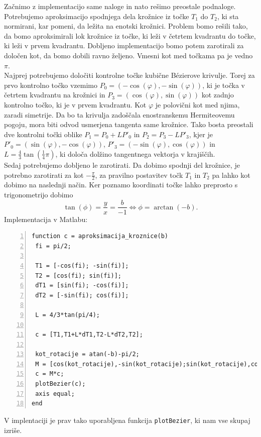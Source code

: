 \documentclass[a4paper,12pt]{article}
\begin{document}
	Začnimo z implementacijo same naloge in nato rešimo preostale podnaloge.
	Potrebujemo aproksimacijo spodnjega dela krožnice iz točke $T_1$ do $T_2$, ki sta normirani, kar pomeni, da ležita na enotski krožnici.
	Problem bomo rešili tako, da bomo aproksimirali lok krožnice iz točke, ki leži v četrtem kvadrantu do točke, ki leži v prvem kvadrantu. 
	Dobljeno implementacijo bomo potem zarotirali za določen kot, da bomo dobili ravno željeno. Vmesni kot med točkama pa je vedno $\pi$.
	\\
	Najprej potrebujemo določiti kontrolne točke kubične B\'{e}zierove krivulje. Torej za prvo kontrolno točko vzemimo $P_0 = (-\cos(\varphi), -\sin(\varphi))$, 
	ki je točka v četrtem kvadrantu na krožnici in 
	$P_3 = (\cos(\varphi), \sin(\varphi))$ kot zadnjo kontrolno točko, ki je v prvem kvadrantu. Kot $\varphi$ je polovični kot med njima, zaradi simetrije.
	Da bo ta krivulja zadoščala enostranskemu Hermiteovemu pogoju, mora biti odvod usmerjena tangenta same krožnice.
	Tako bosta preostali dve kontrolni točki oblike $P_1 = P_0 + LP'_0$ in $P_2 = P_3 - LP'_3$, kjer je $P'_0 = (\sin(\varphi), -\cos(\varphi))$, $P'_3 = (-\sin(\varphi), \cos(\varphi))$ in
	$L = \frac{4}{3} \tan(\frac{1}{4}\pi)$, ki določa dolžino tangentnega vektorja v krajiščih.
	\\
	Sedaj potrebujemo dobljeno le zarotirati. Da dobimo spodnji del krožnice, je potrebno zarotirati za kot $-\frac{\pi}{2}$, za pravilno postavitev 
	točk $T_1$ in $T_2$ pa lahko kot dobimo na naslednji način. Ker poznamo koordinati točke lahko preprosto s trigonometrijo dobimo
	$$\tan(\phi) = \frac{y}{x} = \frac{b}{-1} \Leftrightarrow \phi = \arctan(-b).$$
	Implementacija v Matlabu:
	
	\begin{lstlisting}[style=Matlab-editor,	numbers=left,]
function c = aproksimacija_kroznice(b)
 fi = pi/2;
		
 T1 = [-cos(fi); -sin(fi)];
 T2 = [cos(fi); sin(fi)];
 dT1 = [sin(fi); -cos(fi)];
 dT2 = [-sin(fi); cos(fi)];
		
 L = 4/3*tan(pi/4);
		
 c = [T1,T1+L*dT1,T2-L*dT2,T2];
		
 kot_rotacije = atan(-b)-pi/2;
 M = [cos(kot_rotacije),-sin(kot_rotacije);sin(kot_rotacije),cos(kot_rotacije)];
 c = M*c;
 plotBezier(c); 
 axis equal;
end
	\end{lstlisting}
	
	\noindent V implentaciji je prav tako uporabljena funkcija \lstinline[style=Matlab-editor]!plotBezier!, ki nam vse skupaj izriše.
	
\end{document}
